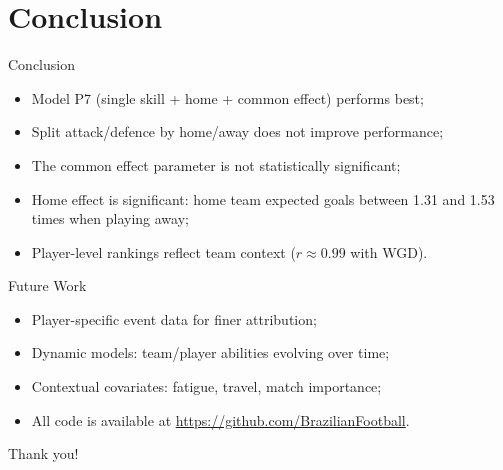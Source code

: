 \documentclass{beamer}
\begin{document}
\section{Conclusion}

\begin{frame}{Conclusion}
    \begin{itemize}
        \item Model P7 (single skill + home + common effect) performs best;
        
        \item Split attack/defence by home/away does not improve performance;
        
        \item The common effect parameter is not statistically significant;
        
        \item Home effect is significant: home team expected goals between 1.31 and 1.53 times when playing away;
        
        \item Player-level rankings reflect team context ($r \approx 0.99$ with WGD).
    \end{itemize}
\end{frame}

\begin{frame}{Future Work}
    \begin{itemize}
        \item Player-specific event data for finer attribution;

        \item Dynamic models: team/player abilities evolving over time;

        \item Contextual covariates: fatigue, travel, match importance;

        \item All code is available at \url{https://github.com/BrazilianFootball}.
    \end{itemize}
\end{frame}

\begin{frame}{}
    \centering
    \vspace{2cm}
    {\Large Thank you!}
\end{frame}
\end{document}
